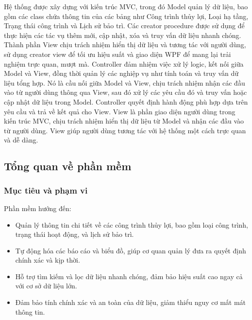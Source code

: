 \documentclass{article} %
\begin{document}
Hệ thống được xây dựng với kiến trúc MVC, 
trong đó Model quản lý dữ liệu, bao gồm các class chứa thông tin của các bảng như Công 
trình thủy lợi, Loại hạ tầng, Trạng thái công trình và Lịch sử bảo trì. 
Các creator procedure được sử dụng để thực hiện các tác vụ thêm mới, 
cập nhật, xóa và truy vấn dữ liệu nhanh chóng. 
Thành phần View chịu trách nhiệm hiển thị dữ liệu và tương 
tác với người dùng, sử dụng creator view để tối ưu hiệu suất 
và giao diện WPF để mang lại trải nghiệm trực quan, mượt mà. 
Controller đảm nhiệm việc xử lý logic, kết nối giữa Model và View, 
đồng thời quản lý các nghiệp vụ như tính toán và truy vấn dữ liệu tổng hợp.
Nó là cầu nối giữa Model và View, 
chịu trách nhiệm nhận các đầu vào từ người dùng thông qua View, 
sau đó xử lý các yêu cầu đó và truy vấn hoặc cập nhật dữ liệu trong Model. 
Controller quyết định hành động phù hợp dựa trên yêu cầu và trả về 
kết quả cho View.
View là phần giao diện người dùng trong kiến trúc MVC, 
chịu trách nhiệm hiển thị dữ liệu từ Model và nhận các đầu 
vào từ người dùng. View giúp người dùng tương tác với hệ thống 
một cách trực quan và dễ dàng.




\subsection{Tổng quan về phần mềm}
\subsubsection{Mục tiêu và phạm vi}
Phần mềm hướng đến:
\begin{itemize}
    \item Quản lý thông tin chi tiết về các công trình thủy lợi, bao gồm loại công trình, trạng thái hoạt động, và lịch sử bảo trì.
    \item Tự động hóa các báo cáo và biểu đồ, giúp cơ quan quản lý đưa ra quyết định chính xác và kịp thời.
    \item Hỗ trợ tìm kiếm và lọc dữ liệu nhanh chóng, đảm bảo hiệu suất cao ngay cả với cơ sở dữ liệu lớn.
    \item Đảm bảo tính chính xác và an toàn của dữ liệu, giảm thiểu nguy cơ mất mát thông tin.
\end{itemize}
\end{document}
